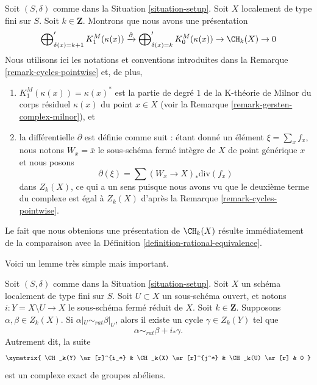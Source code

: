 \begin{remark}
\label{remark-chow-group-pointwise}
Soit $(S, \delta)$ comme dans la Situation \ref{situation-setup}.
Soit $X$ localement de type fini sur $S$. Soit $k \in \mathbf{Z}$.
Montrons que nous avons une présentation
$$
\bigoplus\nolimits_{\delta(x) = k + 1}' K_1^M(\kappa(x))
\xrightarrow{\partial}
\bigoplus\nolimits_{\delta(x) = k}' K_0^M(\kappa(x)) \to
\CH_k(X) \to 0
$$
Nous utilisons ici les notations et conventions introduites dans la
Remarque \ref{remark-cycles-pointwise} et, de plus,
\begin{enumerate}
\item $K_1^M(\kappa(x)) = \kappa(x)^*$ est la partie de degré $1$ de
la K-théorie de Milnor du corps résiduel $\kappa(x)$ du point
$x \in X$ (voir la Remarque \ref{remark-gersten-complex-milnor}), et
\item la différentielle $\partial$ est définie comme suit :
étant donné un élément $\xi = \sum_x f_x$, nous notons $W_x = \overline{x}$
le sous-schéma fermé intègre de $X$ de point générique $x$ et nous posons
$$
\partial(\xi) = \sum (W_x \to X)_*\text{div}(f_x)
$$
dans $Z_k(X)$, ce qui a un sens puisque nous avons vu que le deuxième
terme du complexe est égal à $Z_k(X)$ d'après la
Remarque \ref{remark-cycles-pointwise}.
\end{enumerate}
Le fait que nous obtenions une présentation de $\CH_k(X)$ résulte
immédiatement de la comparaison avec la Définition \ref{definition-rational-equivalence}.
\end{remark}

\noindent
Voici un lemme très simple mais important.

\begin{lemma}
\label{lemma-restrict-to-open}
Soit $(S, \delta)$ comme dans la Situation \ref{situation-setup}.
Soit $X$ un schéma localement de type fini sur $S$.
Soit $U \subset X$ un sous-schéma ouvert, et notons
$i : Y = X \setminus U \to X$ le sous-schéma fermé réduit de $X$.
Soit $k \in \mathbf{Z}$.
Supposons $\alpha, \beta \in Z_k(X)$.
Si $\alpha|_U \sim_{rat} \beta|_U$, alors il existe un cycle
$\gamma \in Z_k(Y)$ tel que
$$
\alpha \sim_{rat} \beta + i_*\gamma.
$$
Autrement dit, la suite
$$
\xymatrix{
\CH_k(Y) \ar[r]^{i_*} & \CH_k(X) \ar[r]^{j^*} & \CH_k(U) \ar[r] & 0
}
$$
est un complexe exact de groupes abéliens.
\end{lemma}

